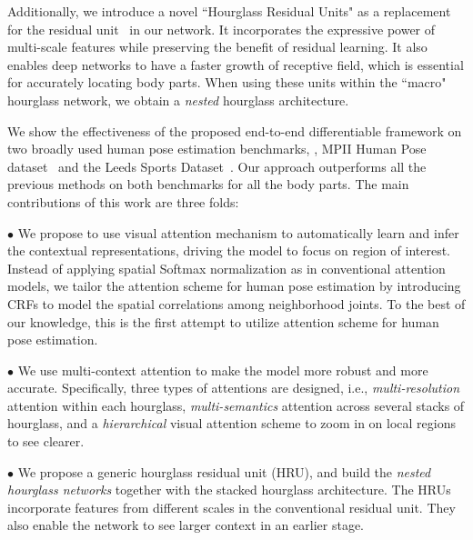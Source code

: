 \documentclass[10pt,twocolumn,letterpaper]{article}
\newenvironment{myitemize}[1][]{
\begin{list}{{#1}} {
	\setlength{\leftmargin}{1.1em}
	\setlength{\topsep}{0em}
	\setlength{\itemsep}{-0.5em}
}}
{\end{list}}
\begin{document}
Additionally, we introduce a novel ``Hourglass Residual Units" as a replacement for the residual unit~\cite{he2016deep} in our network.
It incorporates the expressive power of multi-scale features while preserving the benefit of residual learning. 
It also enables deep networks to have a faster growth of receptive field, which is essential for accurately locating body parts. 
When using these units within the ``macro" hourglass network, we obtain a \textit{nested} hourglass architecture. 




We show the effectiveness of the proposed end-to-end differentiable framework on two broadly used human pose estimation benchmarks, \ie, MPII Human Pose dataset~\cite{andriluka20142d} and the Leeds Sports Dataset~\cite{johnson2010clustered}. Our approach outperforms all the previous methods on both benchmarks for all the body parts.
The main contributions of this work are three folds:
\begin{myitemize}
\item[$\bullet$] 
We propose to use visual attention mechanism to automatically learn and infer the contextual representations, driving the model to focus on region of interest.
Instead of applying spatial Softmax normalization as in conventional attention models, we tailor the attention scheme for human pose estimation by introducing CRFs to model the spatial correlations among neighborhood joints.
To the best of our knowledge, this is the first attempt to utilize attention scheme for human pose estimation.


\item[$\bullet$] 
We use multi-context attention to make the model more robust and more accurate. Specifically, three types of attentions are designed, i.e., \textit{multi-resolution} attention within each hourglass, \textit{multi-semantics} attention across several stacks of hourglass, and a \textit{hierarchical} visual attention scheme to zoom in on local regions to see clearer.

\item[$\bullet$] 
We propose a generic hourglass residual unit (HRU), and build the \textit{nested hourglass networks} together with the stacked hourglass architecture. The HRUs incorporate features from different scales in the conventional residual unit. They also enable the network to see larger context in an earlier stage.
 

\end{myitemize}
\end{document}
